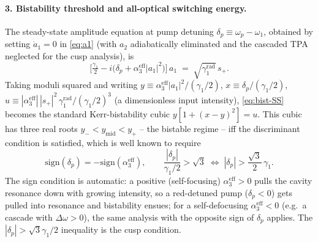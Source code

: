 \documentclass[11pt,a4paper]{article}
\newcommand{\Dom}{\Delta\omega}
\begin{document}
\paragraph{3. Bistability threshold and all-optical switching energy.}
The steady-state amplitude equation at pump detuning
$\delta_p\equiv\omega_p-\omega_1$, obtained by setting $\dot a_1=0$ in
\eqref{eq:a1} (with $a_2$ adiabatically eliminated and the cascaded
TPA neglected for the cusp analysis), is
\begin{equation}
  \bigl[\tfrac{\gamma_1}{2}-i\bigl(\delta_p+\alpha_3^\text{eff}|a_1|^{2}\bigr)\bigr]\,a_1
   \;=\;\sqrt{\gamma_1^\text{rad}}\,s_+.
  \label{eq:bist-SS}
\end{equation}
Taking moduli squared and writing $y\equiv\alpha_3^\text{eff}|a_1|^{2}/(\gamma_1/2)$,
$x\equiv\delta_p/(\gamma_1/2)$, $u\equiv|\alpha_3^\text{eff}|\,|s_+|^{2}\,
\gamma_1^\text{rad}/(\gamma_1/2)^{3}$ (a dimensionless input intensity),
\eqref{eq:bist-SS} becomes the standard Kerr-bistability cubic
$y[1+(x-y)^{2}]=u$.  This cubic has three real roots
$y_-<y_\text{mid}<y_+$ -- the bistable regime -- iff the discriminant
condition is satisfied, which is well known
\cite{DrummondWalls1980,Boyd} to require
\begin{equation}
  \mathrm{sign}(\delta_p)=-\mathrm{sign}(\alpha_3^\text{eff}),
  \qquad
  \frac{|\delta_p|}{\gamma_1/2}>\sqrt{3}\;\Longleftrightarrow\;
  |\delta_p|>\frac{\sqrt{3}}{2}\,\gamma_1.
  \label{eq:bist-cusp}
\end{equation}
The sign condition is automatic: a positive (self-focusing)
$\alpha_3^\text{eff}>0$ pulls the cavity resonance down with growing
intensity, so a red-detuned pump ($\delta_p<0$) gets pulled into
resonance and bistability ensues; for a self-defocusing
$\alpha_3^\text{eff}<0$ (e.g.\ a cascade with $\Dom>0$), the same
analysis with the opposite sign of $\delta_p$ applies.  The
$|\delta_p|>\sqrt{3}\gamma_1/2$ inequality is the cusp condition.
\end{document}
